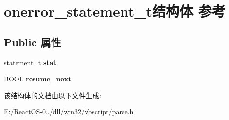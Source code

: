 \hypertarget{structonerror__statement__t}{}\section{onerror\+\_\+statement\+\_\+t结构体 参考}
\label{structonerror__statement__t}
\subsection*{Public 属性}
\begin{DoxyCompactItemize}
\item 
\mbox{\label{structonerror__statement__t_a403395d9deed6a204df441cfae431399}} 
\hyperlink{struct__statement__t}{statement\+\_\+t} {\bfseries stat}
\item 
\mbox{\label{structonerror__statement__t_a3c0ee47897842e938fe53682fccc87dd}} 
B\+O\+OL {\bfseries resume\+\_\+next}
\end{DoxyCompactItemize}


该结构体的文档由以下文件生成\+:\begin{DoxyCompactItemize}
\item 
E\+:/\+React\+O\+S-\/0../dll/win32/vbscript/parse.\+h\end{DoxyCompactItemize}
